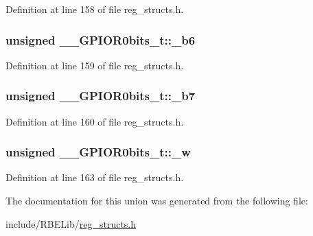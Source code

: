Definition at line 158 of file reg\+\_\+structs.\+h.

\hypertarget{union_____g_p_i_o_r0bits__t_a0913a13ad50ad618da0dc2b56816599f}{
\subsubsection[{\+\_\+b6}]{\setlength{\rightskip}{0pt plus 5cm}unsigned \+\_\+\+\_\+\+G\+P\+I\+O\+R0bits\+\_\+t\+::\+\_\+b6}}\label{union_____g_p_i_o_r0bits__t_a0913a13ad50ad618da0dc2b56816599f}


Definition at line 159 of file reg\+\_\+structs.\+h.

\hypertarget{union_____g_p_i_o_r0bits__t_a3ec4b94a17c19e94ae411bb1ebce54c9}{
\subsubsection[{\+\_\+b7}]{\setlength{\rightskip}{0pt plus 5cm}unsigned \+\_\+\+\_\+\+G\+P\+I\+O\+R0bits\+\_\+t\+::\+\_\+b7}}\label{union_____g_p_i_o_r0bits__t_a3ec4b94a17c19e94ae411bb1ebce54c9}


Definition at line 160 of file reg\+\_\+structs.\+h.

\hypertarget{union_____g_p_i_o_r0bits__t_ad64bc463ae2a687840ec4dbf60cbb1e2}{
\subsubsection[{\+\_\+w}]{\setlength{\rightskip}{0pt plus 5cm}unsigned \+\_\+\+\_\+\+G\+P\+I\+O\+R0bits\+\_\+t\+::\+\_\+w}}\label{union_____g_p_i_o_r0bits__t_ad64bc463ae2a687840ec4dbf60cbb1e2}


Definition at line 163 of file reg\+\_\+structs.\+h.



The documentation for this union was generated from the following file\+:\begin{DoxyCompactItemize}
\item 
include/\+R\+B\+E\+Lib/\hyperlink{reg__structs_8h}{reg\+\_\+structs.\+h}\end{DoxyCompactItemize}
